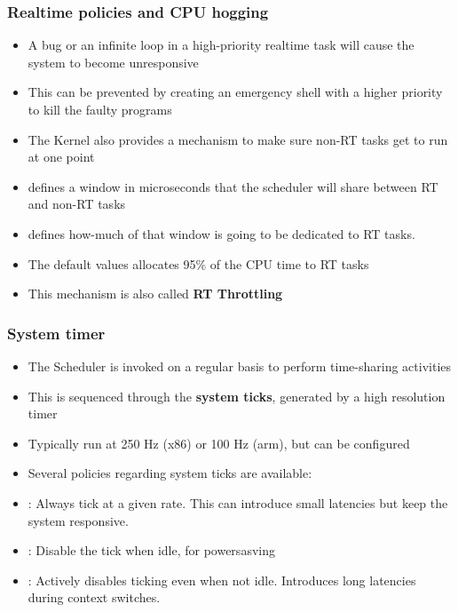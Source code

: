 

\begin{frame}
        \frametitle{Realtime policies and CPU hogging}
        \begin{itemize}
                \item A bug or an infinite loop in a high-priority realtime task will cause the system to become unresponsive
                \item This can be prevented by creating an emergency shell with a higher priority to kill the faulty programs
                \item The Kernel also provides a mechanism to make sure non-RT tasks get to run at one point
                \item {} defines a window in microseconds that the scheduler will share between RT and non-RT tasks
                \item {} defines how-much of that window is going to be dedicated to RT tasks.
                \item The default values allocates 95\% of the CPU time to RT tasks
                \item This mechanism is also called \textbf{RT Throttling}
        \end{itemize}
\end{frame}

\begin{frame}
        \frametitle{System timer}
        \begin{itemize}
                \item The Scheduler is invoked on a regular basis to perform time-sharing activities
                \item This is sequenced through the \textbf{system ticks}, generated by a high resolution timer
                \item Typically run at 250 Hz (x86) or 100 Hz (arm), but can be configured
                \item Several policies regarding system ticks are available:
                \item {}: Always tick at a given rate. This can introduce small latencies but keep the system responsive.
                \item {}: Disable the tick when idle, for powersasving
                \item {}: Actively disables ticking even when not idle. Introduces long latencies during context switches.
        \end{itemize}
\end{frame}

